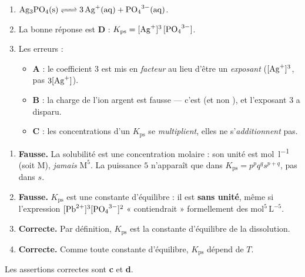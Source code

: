 \documentclass[11pt,a4paper]{article}
\begin{document}
\begin{corrige}
\begin{enumerate}[label=\alph*)]
  \item $\ce{Ag3PO4(s) <=> 3 Ag^{+}(aq) + PO4^{3-}(aq)}$.
  \item La bonne réponse est \textbf{D} : $K_{\mathrm{ps}} = [\ce{Ag+}]^{3}\,[\ce{PO4^{3-}}]$.
  \item Les erreurs :
    \begin{itemize}[leftmargin=1.6em,topsep=2pt,itemsep=1.5pt]
      \item \textbf{A} : le coefficient $3$ est mis en \emph{facteur} au lieu d'être un
            \emph{exposant} ($[\ce{Ag+}]^{3}$, pas $3[\ce{Ag+}]$).
      \item \textbf{B} : la charge de l'ion argent est fausse — c'est  (et non ),
            et l'exposant $3$ a disparu.
      \item \textbf{C} : les concentrations d'un $K_{\mathrm{ps}}$ se \emph{multiplient}, elles ne
            s'\emph{additionnent} pas.
    \end{itemize}
\end{enumerate}
\end{corrige}

\begin{corrige}
\begin{enumerate}[label=\alph*)]
  \item \textbf{Fausse.} La solubilité est une concentration molaire : son unité est \si{\mole\per\litre}
        (soit M), \emph{jamais} $\mathrm{M}^{5}$. La puissance $5$ n'apparaît que dans
        $K_{\mathrm{ps}}=p^{p}q^{q}s^{p+q}$, pas dans $s$.
  \item \textbf{Fausse.} $K_{\mathrm{ps}}$ est une constante d'équilibre : il est \textbf{sans unité},
        même si l'expression $[\ce{Pb^{2+}}]^{3}[\ce{PO4^{3-}}]^{2}$ « contiendrait »
        formellement des $\mathrm{mol^{5}\,L^{-5}}$.
  \item \textbf{Correcte.} Par définition, $K_{\mathrm{ps}}$ est la constante d'équilibre de la
        dissolution.
  \item \textbf{Correcte.} Comme toute constante d'équilibre, $K_{\mathrm{ps}}$ dépend de $T$.
\end{enumerate}
Les assertions correctes sont \textbf{c} et \textbf{d}.
\end{corrige}
\end{document}
